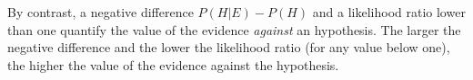 \documentclass[10pt]{article}
\begin{document}
\begin{comment} 
The following table %
offers some illustrations:

\vspace{2mm}
\hspace{0.5cm}
\begin{centering}
\begin{tabular}{lccccc}
\hline
$P(H)$ & Likelihood Ratio & $P(H | E)$ &  $P(H|E)-P(H)$ \\
\hline
0.0001 & 1,000 & 0.09 &  0.0899   \\
0.1 & 1,000  & 0.99 &  0.89 \\
\hline
0.0001 & 10  & 0.001 &  0.0009 \\
0.01 & 10  & 0.09 &  0.08  \\
\hline
\end{tabular}
\end{centering}
\vspace{2mm}

\noindent
All in all, a positive difference $P(H|E) - P(H)$ and a likelihood ratio $\frac{P(E|H)}{P(E| \neg H)}$ greater than one
quantify, albeit in different ways, the value of the evidence \textit{for} 
an hypothesis. 
\end{comment}
 By contrast, a negative difference $P(H | E) - P(H)$ and a likelihood ratio lower than one  
quantify the value of the evidence \textit{against} an hypothesis.
The larger the negative difference and the lower the likelihood ratio (for any value below one), 
the higher the value of the evidence against the hypothesis.

\end{document}
